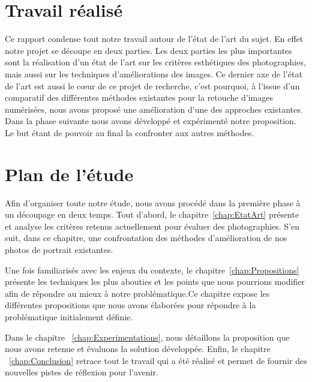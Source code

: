 \documentclass[11pt, french]{report-rd-info}
\begin{document}
\section{Travail réalisé}
Ce rapport condense tout notre travail autour de l'état de l'art du sujet. En effet notre projet se découpe en deux parties. Les deux parties les plus importantes sont la réalisation d'un état de l'art sur les critères esthétiques des photographies, mais aussi sur les techniques d'améliorations des images. Ce dernier axe de l'état de l'art est aussi le cœur de ce projet de recherche, c'est pourquoi, à l'issue d'un comparatif des différentes méthodes existantes pour la retouche d'images numérisées, nous avons proposé une amélioration d'une des approches existantes.
Dans la phase suivante nous avons développé et expérimenté notre proposition. Le but étant de pouvoir au final la confronter aux autres méthodes.

 

\section{Plan de l'étude}
Afin d'organiser toute notre étude, nous avons procédé dans la première phase à un découpage en deux temps. Tout d'abord, le chapitre~\ref{chap:EtatArt} présente et analyse les critères retenus actuellement pour évaluer des photographies. S'en suit, dans ce chapitre, une confrontation des méthodes d'amélioration de nos photos de portrait existantes.

Une fois familiarisés avec les enjeux du contexte, le chapitre~\ref{chap:Propositions} présente les techniques les plus abouties et les points que nous pourrions modifier afin de répondre au mieux à notre problématique.Ce chapitre expose les différentes propositions que nous avons élaborées pour répondre à la problématique initialement définie.

Dans le chapitre ~\ref{chap:Experimentations}, nous détaillons la proposition que nous avons retenue et évaluons la solution développée.
Enfin, le chapitre ~\ref{chap:Conclusion} retrace tout le travail qui a été réalisé et permet de fournir des nouvelles pistes de réflexion pour l'avenir.

\end{document}
